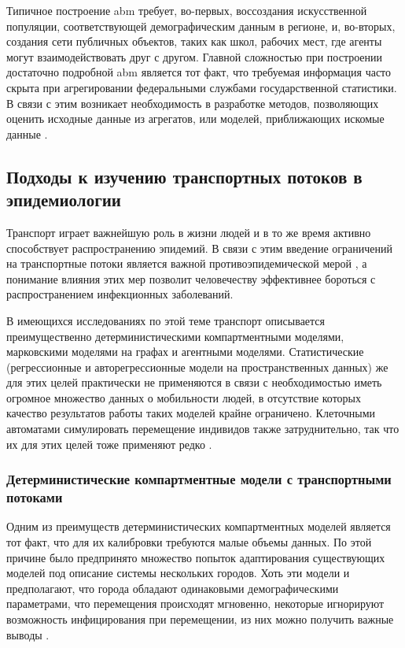 \documentclass[a4paper,12pt]{article} %
\begin{document}
Типичное построение \gls{abm} требует, во-первых, воссоздания искусственной популяции, соответствующей демографическим данным в регионе, и, во-вторых, создания сети публичных объектов, таких как школ, рабочих мест, где агенты могут взаимодействовать друг с другом. Главной сложностью при построении достаточно подробной \gls{abm} является тот факт, что требуемая информация часто скрыта при агрегировании федеральными службами государственной статистики. В связи с этим возникает необходимость в разработке методов, позволяющих оценить исходные данные из агрегатов, или моделей, приближающих искомые данные \cite{rakowski2010influenza}. 

\subsection{Подходы к изучению транспортных потоков в эпидемиологии}
Транспорт играет важнейшую роль в жизни людей и в то же время активно способствует распространению эпидемий. В связи с этим введение ограничений на транспортные потоки является важной противоэпидемической мерой \cite{li2021modeling}, а понимание влияния этих мер позволит человечеству эффективнее бороться с распространением инфекционных заболеваний.

В имеющихся исследованиях по этой теме транспорт описывается преимущественно детерминистическими компартментными моделями, марковскими моделями на графах и агентными моделями. Статистические (регрессионные и авторегрессионные модели на пространственных данных) же для этих целей практически не применяются в связи с необходимостью иметь огромное множество данных о мобильности людей, в отсутствие которых качество результатов работы таких моделей крайне ограничено. Клеточными автоматами симулировать перемещение индивидов также затруднительно, так что их для этих целей тоже применяют редко \cite{li2021modeling}.

\subsubsection{Детерминистические компартментные модели с транспортными потоками}
Одним из преимуществ детерминистических компартментных моделей является тот факт, что для их калибровки требуются малые объемы данных. По этой причине было предпринято множество попыток адаптирования существующих моделей под описание системы нескольких городов. Хоть эти модели и предполагают, что города обладают одинаковыми демографическими параметрами, что перемещения происходят мгновенно, некоторые игнорируют возможность инфицирования при перемещении, из них можно получить важные выводы \cite{li2021modeling}.
\end{document}
